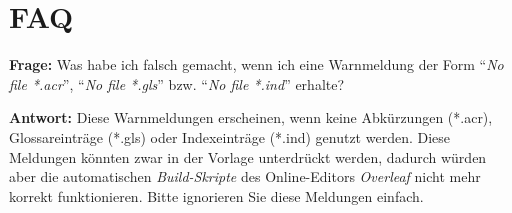 \documentclass[
%
	thesis=paper,		%
	compactlistof,		%
	noauthorship,		%
%
	fancy,				%
%
%
]{hsmw-thesis}
\begin{document}
	\appendix
	
	
	
	\chapter{FAQ}
	
	\textbf{Frage:}
	Was habe ich falsch gemacht, wenn ich eine Warnmeldung der Form \enquote{\textit{No file *.acr}}, \enquote{\textit{No file *.gls}} bzw. \enquote{\textit{No file *.ind}} erhalte?
	
	\textbf{Antwort:}
	Diese Warnmeldungen erscheinen, wenn keine Abkürzungen (*.acr), Glossareinträge (*.gls) oder Indexeinträge (*.ind) genutzt werden.
	Diese Meldungen könnten zwar in der Vorlage unterdrückt werden, dadurch würden aber die automatischen \textit{Build-Skripte} des Online-Editors \textit{Overleaf} nicht mehr korrekt funktionieren.
	Bitte ignorieren Sie diese Meldungen einfach.
\end{document}
